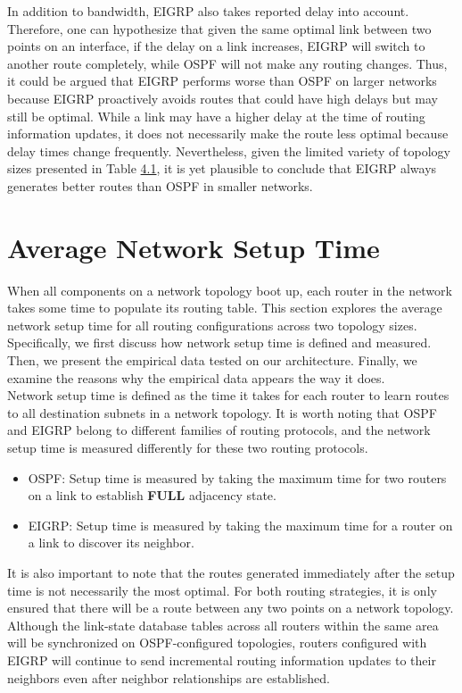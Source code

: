 \documentclass{uiucthesis2021}
\begin{document}
\noindent In addition to bandwidth, EIGRP also takes reported delay into account. Therefore, one can hypothesize that given the same optimal link between two points on an interface, if the delay on a link increases, EIGRP will switch to another route completely, while OSPF will not make any routing changes. Thus, it could be argued that EIGRP performs worse than OSPF on larger networks because EIGRP proactively avoids routes that could have high delays but may still be optimal. While a link may have a higher delay at the time of routing information updates, it does not necessarily make the route less optimal because delay times change frequently. Nevertheless, given the limited variety of topology sizes presented in Table \hyperref[t41]{4.1}, it is yet plausible to conclude that EIGRP always generates better routes than OSPF in smaller networks. 

\section{Average Network Setup Time}
\noindent When all components on a network topology boot up, each router in the network takes some time to populate its routing table. This section explores the average network setup time for all routing configurations across two topology sizes. Specifically, we first discuss how network setup time is defined and measured. Then, we present the empirical data tested on our architecture. Finally, we examine the reasons why the empirical data appears the way it does.\\

\noindent Network setup time is defined as the time it takes for each router to learn routes to all destination subnets in a network topology. It is worth noting that OSPF and EIGRP belong to different families of routing protocols, and the network setup time is measured differently for these two routing protocols.
\begin{itemize}
    \item OSPF: Setup time is measured by taking the maximum time for two routers on a link to establish \textbf{FULL} adjacency state. 
    \item EIGRP: Setup time is measured by taking the maximum time for a router on a link to discover its neighbor.
\end{itemize}
\noindent It is also important to note that the routes generated immediately after the setup time is not necessarily the most optimal. For both routing strategies, it is only ensured that there will be a route between any two points on a network topology. Although the link-state database tables across all routers within the same area will be synchronized on OSPF-configured topologies, routers configured with EIGRP will continue to send incremental routing information updates to their neighbors even after neighbor relationships are established. \\
\end{document}
